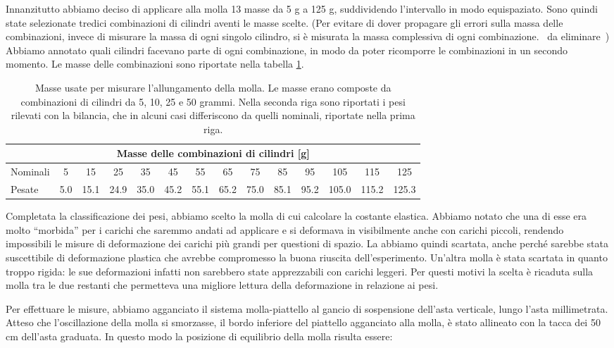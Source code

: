 Innanzitutto abbiamo deciso di applicare alla molla 13 masse da 5 g a 125 g, suddividendo l'intervallo in modo equispaziato.
Sono quindi state selezionate tredici combinazioni di cilindri aventi le masse scelte.
(Per evitare di dover propagare gli errori sulla massa delle combinazioni, invece di misurare la massa di ogni singolo cilindro, si è misurata la massa complessiva di ogni combinazione. ~da eliminare~)
Abbiamo annotato quali cilindri facevano parte di ogni combinazione, in modo da poter ricomporre le combinazioni in un secondo momento. Le masse delle combinazioni sono riportate nella tabella \ref{tab:masse}.

\begin{table}[tb]
    \centering
    \small
    \begin{tabular}{l | c c c c c c c c c c c c c}
        \multicolumn{14}{c}{Masse delle combinazioni di cilindri [g]} \\[1mm]
        \toprule
        Nominali & 5 & 15 & 25 & 35 & 45 & 55 & 65 & 75 & 85 & 95 & 105 & 115 & 125 \\
        Pesate & 5.0 & 15.1 & 24.9 & 35.0 & 45.2 & 55.1 & 65.2 & 75.0 & 85.1 & 95.2 & 105.0 & 115.2 & 125.3 \\
        \bottomrule
    \end{tabular}
    \caption{Masse usate per misurare l'allungamento della molla. Le masse erano composte da combinazioni
    di cilindri da 5, 10, 25 e 50 grammi. Nella seconda riga sono riportati i pesi rilevati con
    la bilancia, che in alcuni casi differiscono da quelli nominali, riportate nella prima riga.}
    \label{tab:masse}
\end{table}

Completata la classificazione dei pesi, abbiamo scelto la molla di cui calcolare la
costante elastica. Abbiamo notato che una di esse era molto ``morbida'' per i carichi che saremmo
andati ad applicare e si deformava in visibilmente anche con carichi piccoli, rendendo impossibili
le misure di deformazione dei carichi più grandi per questioni di spazio.
La abbiamo quindi scartata, anche perché sarebbe stata suscettibile di deformazione
plastica che avrebbe compromesso la buona riuscita dell'esperimento.
Un'altra molla è stata scartata in quanto troppo rigida: le sue deformazioni infatti non sarebbero state apprezzabili con carichi leggeri. Per questi motivi la scelta è ricaduta sulla molla tra 
le due restanti che permetteva una migliore lettura della deformazione in relazione ai pesi.

Per effettuare le misure, abbiamo agganciato il sistema molla-piattello al gancio di sospensione dell'asta verticale, lungo l'asta millimetrata. Atteso che l'oscillazione della molla si smorzasse, il bordo inferiore del piattello agganciato alla molla, è stato allineato con la tacca dei 50 cm dell'asta graduata. In questo modo la posizione di equilibrio della molla risulta essere:

